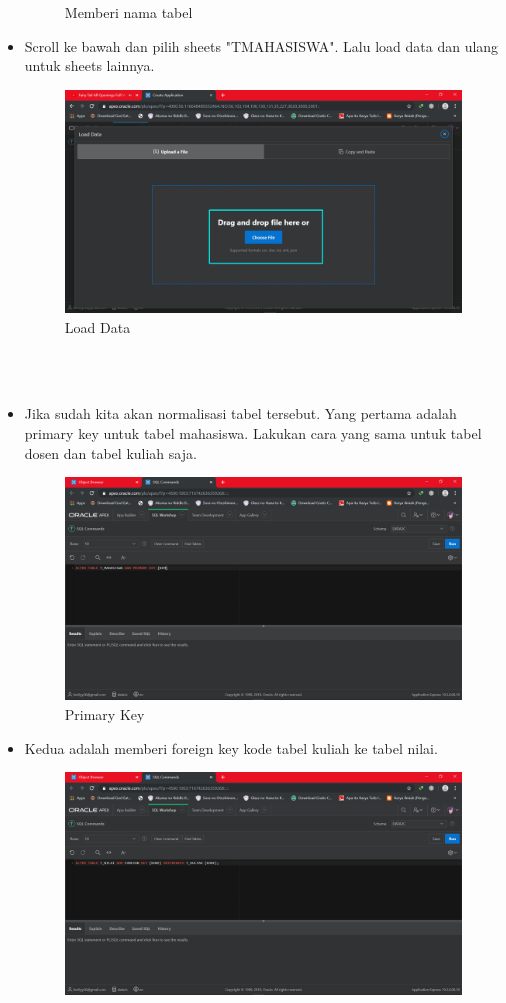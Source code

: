 \documentclass[12pt, times new roman]{article}
\begin{document}
\begin{itemize}
\begin{figure}[htbp]
	\caption{Memberi nama tabel}
\end{figure}
\item Scroll ke bawah dan pilih sheets "TMAHASISWA". Lalu load data dan ulang untuk sheets lainnya.
\begin{figure}[htbp]
	\centering
	\includegraphics[width=10.5cm]{figures/6.png}
	\caption{Load Data}
\end{figure}\\
\\
\item Jika sudah kita akan normalisasi tabel tersebut. Yang pertama adalah primary key untuk tabel mahasiswa. Lakukan cara yang sama untuk tabel dosen dan tabel kuliah saja.
\begin{figure}[htbp]
	\centering
	\includegraphics[width=10.5cm]{figures/Screenshot_7.png}
	\caption{Primary Key}
\end{figure}
\item Kedua adalah memberi foreign key kode tabel kuliah ke tabel nilai.
\begin{figure}[htbp]
	\centering
	\includegraphics[width=10.5cm]{figures/Screenshot_8.png}

\end{figure}
\end{itemize}
\end{document}
